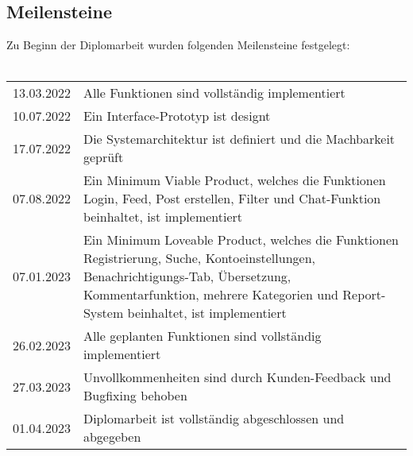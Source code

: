 \subsection{Meilensteine}

Zu Beginn der Diplomarbeit wurden folgenden Meilensteine festgelegt:
\\\\
\begin{tabular}{|c|p{10cm}|}
    \hline
    13.03.2022 & Alle Funktionen sind vollständig implementiert                                                                                                                                                                           \\
    10.07.2022 & Ein Interface-Prototyp ist designt                                                                                                                                                                                       \\
    17.07.2022 & Die Systemarchitektur ist definiert und die Machbarkeit geprüft                                                                                                                                                          \\
    07.08.2022 & Ein Minimum Viable Product, welches die Funktionen Login, Feed, Post erstellen, Filter und Chat-Funktion beinhaltet, ist implementiert                                                                                   \\
    07.01.2023 & Ein Minimum Loveable Product, welches die Funktionen Registrierung, Suche, Kontoeinstellungen, Benachrichtigungs-Tab, Übersetzung, Kommentarfunktion, mehrere Kategorien und Report-System beinhaltet, ist implementiert \\
    26.02.2023 & Alle geplanten Funktionen sind vollständig implementiert                                                                                                                                                                 \\
    27.03.2023 & Unvollkommenheiten sind durch Kunden-Feedback und Bugfixing behoben                                                                                                                                                      \\
    01.04.2023 & Diplomarbeit ist vollständig abgeschlossen und abgegeben                                                                                                                                                                 \\
    \hline
\end{tabular}

